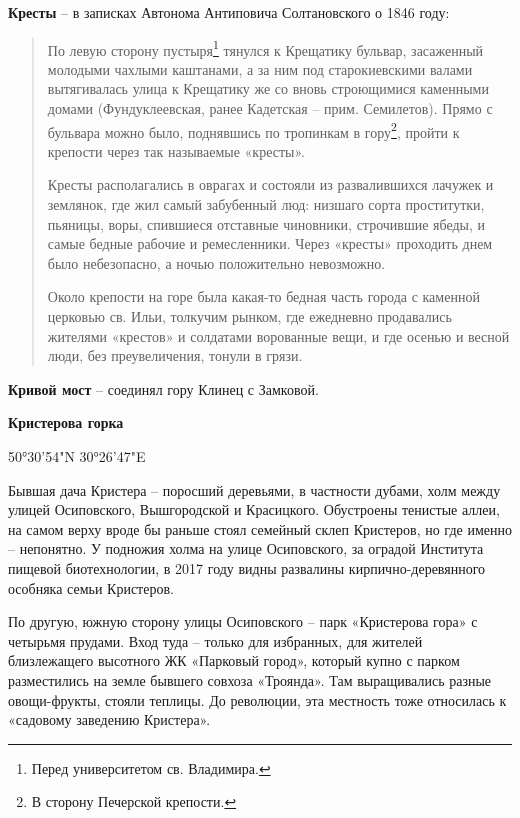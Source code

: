 \medskip

\textbf{Кресты} – в записках Автонома Антиповича Солтановского о 1846 году:

\begin{quotation}
По левую сторону пустыря\footnote{Перед университетом св. Владимира.} тянулся к Крещатику бульвар, засаженный молодыми чахлыми каштанами, а за ним под старокиевскими валами вытягивалась улица к Крещатику же со вновь строющимися каменными домами (Фундуклеевская, ранее Кадетская – прим. Семилетов). Прямо с бульвара можно было, поднявшись по тропинкам в гору\footnote{В сторону Печерской крепости.}, пройти к крепости через так называемые «кресты».

Кресты располагались в оврагах и состояли из развалившихся лачужек и землянок, где жил самый забубенный люд: низшаго сорта проститутки, пьяницы, воры, спившиеся отставные чиновники, строчившие ябеды, и самые бедные рабочие и ремесленники. Через «кресты» проходить днем было небезопасно, а ночью положительно невозможно.

Около крепости на горе была какая-то бедная часть города с каменной церковью св. Ильи, толкучим рынком, где ежедневно продавались жителями «крестов» и солдатами ворованные вещи, и где осенью и весной люди, без преувеличения, тонули в грязи.
\end{quotation}

\medskip



\textbf{Кривой мост} – соединял гору Клинец с Замковой.\\

\medskip

\textbf{Кристерова горка} 

50°30'54"N 30°26'47"E

Бывшая дача Кристера – поросший деревьями, в частности дубами, холм между улицей Осиповского, Вышгородской и Красицкого. Обустроены тенистые аллеи, на самом верху вроде бы раньше стоял семейный склеп Кристеров, но где именно – непонятно. У подножия холма на улице Осиповского, за оградой Института пищевой биотехнологии, в 2017 году видны развалины кирпично-деревянного особняка семьи Кристеров.

По другую, южную сторону улицы Осиповского – парк «Кристерова гора» с четырьмя прудами. Вход туда – только для избранных, для жителей близлежащего высотного ЖК «Парковый город», который купно с парком разместились на земле бывшего совхоза «Троянда». Там выращивались разные овощи-фрукты, стояли теплицы. До революции, эта местность тоже относилась к «садовому заведению Кристера».\\

